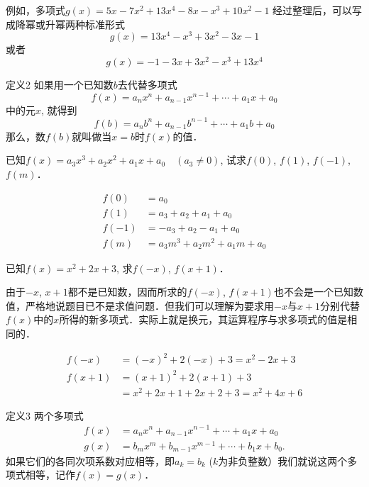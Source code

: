 例如，多项式$g (x) =5x-7x^2+13x^4-8x-x^3+10x^2-1$
经过整理后，可以写成降幂或升幂两种标准形式
\[g (x) =13x^4-x^3+3x^2-3x-1\]
或者
\[g (x) =-1-3x+3x^2-x^3+13x^4\]

\begin{blk}{定义2}
如果用一个已知数$b$去代替多项式
\[f(x)=a_nx^n+a_{n-1}x^{n-1}+\cdots+a_1x +a_0\]
中的元$x$, 就得到
\[f(b)=a_nb^n+a_{n-1}b^{n-1}+\cdots+a_1b +a_0\]
那么，数$f(b)$就叫做当$x=b$时$f(x)$的值．
\end{blk}

\begin{example}
    已知$f(x)=a_3x^3+a_2x^2+a_1x+a_0\quad (a_3\ne 0)$, 试求$f (0)$, $f (1)$, $f (-1)$, $f (m)$． 
\end{example}


\begin{solution}
\[\begin{split}
    f (0) &=a_0\\
    f (1) &=a_3+a_2+a_1+a_0\\
    f (-1) &= -a_3+a_2-a_1+a_0\\
    f (m) &=a_3m^3+a_2m^2+a_1m+a_0
\end{split}\]
\end{solution}

\begin{example}
    已知$f(x)=x^2+2x+3$, 求$f(-x)$, $f(x+1)$．
\end{example}

\begin{analyze}
    由于$-x$, $x+1$都不是已知数，因而所求的$f(-x)$, $f(x+1)$也不会是一个已知数值，严格地说题目已不是求值问题．但我们可以理解为要求用$-x$与$x+1$分别代替$f(x)$中的$x$所得的新多项式．实际上就是换元，其运算程序与求多项式的值是相同的．
\end{analyze}

\begin{solution}
\[\begin{split}
    f(-x)&=(-x)^2+2(-x)+3=x^2-2x+3\\    
    f(x+1)&=(x+1)^2+2(x+1)+3\\
    &=x^2+2x+1+2x+2+3=x^2+4x+6
\end{split}\] 
\end{solution}

\begin{blk}{定义3}
    两个多项式
\[\begin{split}
f (x) &=a_nx^n+a_{n-1}x^{n-1}+\cdots +a_1x+a_0\\
g (x) &=b_mx^m+b_{m-1}x^{m-1}+\cdots+b_1x+b_0.
\end{split}\]
如果它们的各同次项系数对应相等，即$a_k=b_k$ ($k$为非负整数）我们就说这两个多项式相等，记作$f(x)=g(x)$．
\end{blk}



